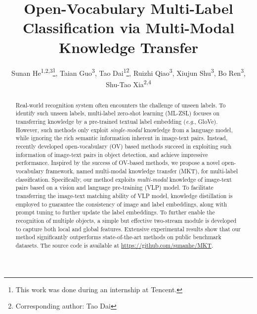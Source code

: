 \documentclass[letterpaper]{article} %
\title{Open-Vocabulary Multi-Label Classification via Multi-Modal Knowledge Transfer}
\author{
    Sunan He\textsuperscript{\rm 1,2,3}\equalcontrib\thanks{This work was done during an internship at Tencent.},
    Taian Guo\textsuperscript{\rm 3}\equalcontrib,
    Tao Dai\textsuperscript{\rm 1}\thanks{Corresponding author: Tao Dai},
    Ruizhi Qiao\textsuperscript{\rm 3},
    Xiujun Shu\textsuperscript{\rm 3},
    Bo Ren\textsuperscript{\rm 3},
    Shu-Tao Xia\textsuperscript{\rm 2,4}
}
\newcommand{\eg}{\textit{e}.\textit{g}.}
\begin{document}
\maketitle

\begin{abstract}
Real-world recognition system often encounters the challenge of unseen labels.
To identify such unseen labels, multi-label zero-shot learning (ML-ZSL) focuses on transferring knowledge by a pre-trained textual label embedding (\eg, GloVe).
However, such methods only exploit \textit{single-modal} knowledge from a language model, while ignoring the rich semantic information inherent in image-text pairs.
Instead, recently developed open-vocabulary (OV) based methods  succeed in exploiting such information of image-text pairs  in  object detection, and achieve impressive performance.
Inspired by the success of OV-based methods, we propose a novel open-vocabulary framework, named multi-modal knowledge transfer (MKT), for  multi-label classification.
Specifically, our method exploits \textit{multi-modal} knowledge of image-text pairs  based on a vision and language pre-training (VLP) model.
To facilitate transferring the image-text matching ability of VLP model, knowledge distillation is employed to guarantee the consistency of image and label embeddings, along with prompt tuning to further update the label embeddings.
To further enable the recognition of multiple objects, a simple but effective two-stream module is developed to capture both local and global features.
Extensive experimental results show that our method significantly outperforms state-of-the-art methods on public benchmark datasets.
The source code is available at \href{https://github.com/sunanhe/MKT}{https://github.com/sunanhe/MKT}.
\end{abstract}
\end{document}
